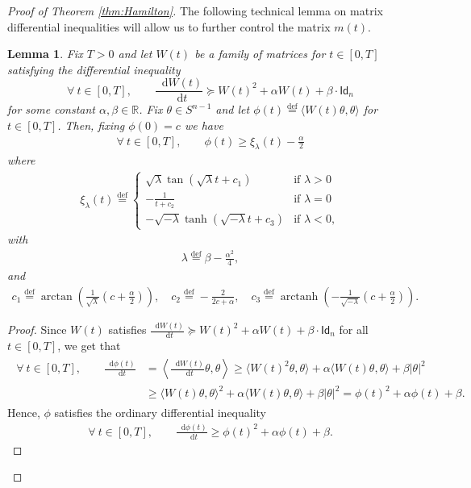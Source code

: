 \documentclass[a4paper,twoside,11pt,reqno]{amsart}
\newcommand{\eqdef}{\stackrel{\mathrm{def}}{=}}
\newtheorem{lemma}[theorem]{Lemma}
\newcommand*\diff{\mathop{}\!\mathrm{d}}
\newcommand{\R}{\mathbb{R}} %
\DeclareMathOperator{\arctanh}{arctanh}
\newcommand{\msf}{\mathsf}
\begin{document}
\begin{proof}[Proof of Theorem \ref{thm:Hamilton}]
The following technical lemma on matrix differential inequalities will allow us to further control the matrix $m(t)$.
\begin{lemma}\label{lem:W(t)}
Fix $T>0$ and let $W(t)$ be a family of matrices for $t\in [0,T]$ satisfying the differential inequality 
\begin{equation}\label{eq:W(t)}
\forall \ t\in [0,T],\qquad \frac{\diff W(t)}{\diff t}\succeq W(t)^2+\alpha W(t)+\beta\cdot \msf{Id}_n
\end{equation}
for some constant $\alpha,\beta\in \R$. Fix $\theta\in S^{n-1}$ and let $\phi(t)\eqdef \langle W(t)\theta,\theta\rangle$ for $t\in [0,T]$. Then, fixing $\phi(0)=c$ we have
\begin{align}\label{eq:phi(T)_lem}
\forall \ t\in[0,T],\qquad \phi(t)\ge \xi_{\lambda}(t)-\frac{\alpha}{2}
\end{align}
where 
\begin{align}\label{eq:xi_lem}
\xi_{\lambda}(t)\eqdef
\begin{cases}
\sqrt{\lambda}\tan(\sqrt{\lambda}t+c_1) & \text{if }\lambda>0\\
-\frac{1}{t+c_2}& \text{if }\lambda=0\\
-\sqrt{-\lambda}\tanh(\sqrt{-\lambda}t+c_3)
 & \text{if }\lambda<0,
\end{cases}
\end{align}
with 
\begin{align}\label{eq:lambda_lem}
\lambda\eqdef\beta-\frac{\alpha^2}{4}, 
\end{align}
and
\begin{align}\label{eq:c_lem}
 c_1\eqdef\arctan\left(\frac{1}{\sqrt{\lambda}}\left(c+\frac{\alpha}{2}\right)\right),\quad c_2\eqdef-\frac{2}{2c+\alpha}, \quad c_3\eqdef\arctanh\left(-\frac{1}{\sqrt{-\lambda}}\left(c+\frac{\alpha}{2}\right)\right).
\end{align}

\end{lemma}
\begin{proof}
Since $W(t)$ satisfies  $\frac{\diff W(t)}{\diff t} \succeq W(t)^2+\alpha W(t)+\beta\cdot \msf{Id}_n$ for all $t\in [0,T]$, we get that
\begin{align}\label{eq:phiIDE_W}
\begin{split}
\forall \ t\in [0,T],\qquad\frac{\diff \phi(t)}{\diff t}&=\left\langle \frac{\diff W(t)}{\diff t}\theta,\theta\right\rangle\ge \langle W(t)^2\theta,\theta\rangle+\alpha  \langle W(t)\theta,\theta\rangle+\beta |\theta|^2\\
&\ge \langle W(t)\theta,\theta\rangle^2+\alpha  \langle W(t)\theta,\theta\rangle+\beta |\theta|^2=\phi(t)^2+\alpha\phi(t)+\beta.
\end{split}
\end{align}
Hence, $\phi$ satisfies the ordinary differential inequality
\begin{align}\label{eq:phiIDE}
\forall \ t\in [0,T],\qquad\frac{\diff \phi(t)}{\diff t}\ge \phi(t)^2+\alpha\phi(t)+\beta.
\end{align}


\end{proof}
\end{proof}
\end{document}
